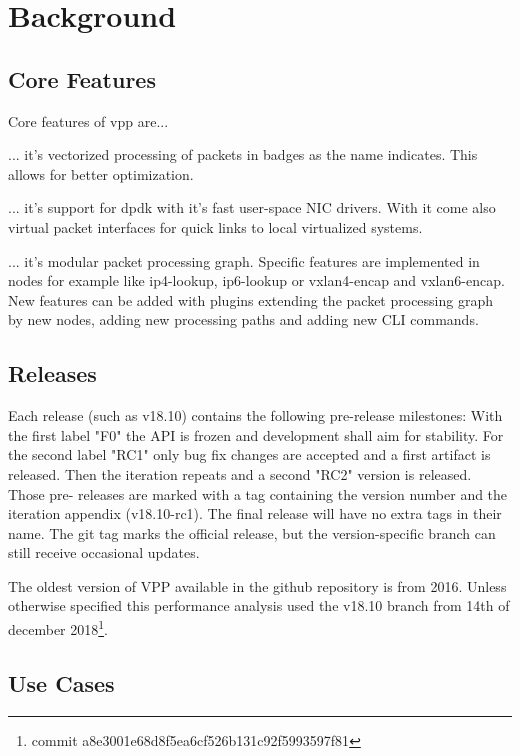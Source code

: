 
\chapter{Background}

\section{Core Features}


Core features of \Ac{vpp} are... 

... it's vectorized processing of packets in badges as the name
indicates. This allows for better optimization.

... it's support for \Ac{dpdk} with it's fast user-space NIC drivers.
With it come also virtual packet interfaces for quick links to local
virtualized systems.

... it's modular packet processing graph. Specific features are
implemented in nodes for example like ip4-lookup, ip6-lookup or
vxlan4-encap and vxlan6-encap. New features can be added with plugins
extending the packet processing graph by new nodes, adding new
processing paths and adding new CLI commands.


\section{Releases}


Each release (such as v18.10) contains the following pre-release
milestones:  With the first label "F0" the API is frozen and
development shall aim for stability. For the second label "RC1" only
bug fix changes are accepted and a first artifact is released. Then
the iteration repeats and a second "RC2" version is released. Those
pre- releases are marked with a tag containing the version number and
the iteration appendix (v18.10-rc1). The final release will have no
extra tags in their name. The git tag marks the official release, but
the version-specific branch can still receive occasional updates.
\cite{vppwiki:releases}

The oldest version of VPP available in the github repository is from
2016. Unless otherwise specified this performance analysis used the
v18.10 branch from 14th of december 2018\footnote{commit
a8e3001e68d8f5ea6cf526b131c92f5993597f81}.


\section{Use Cases}


